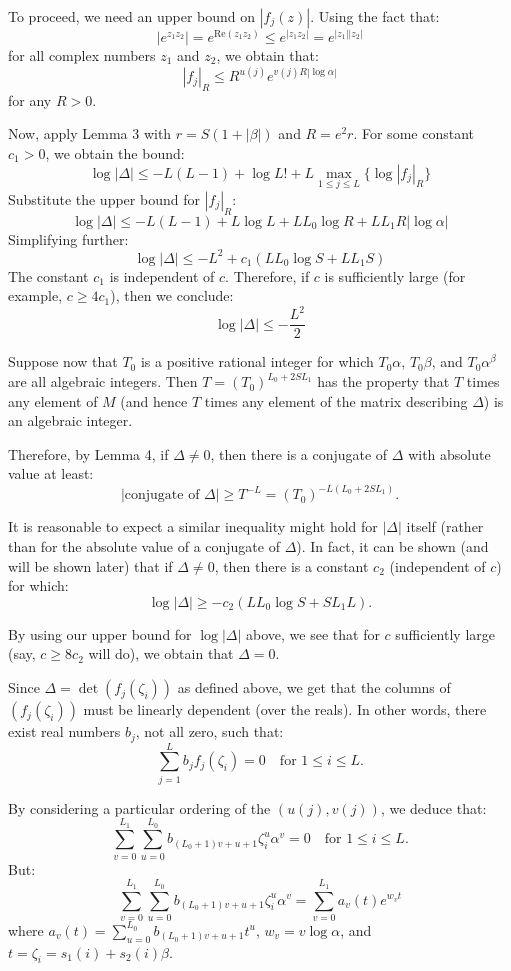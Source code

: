 \documentclass{article}
\newenvironment{proofbox}
  {\begin{mdframed}[linewidth=1pt,linecolor=black,backgroundcolor=white]\noindent\ignorespaces}
  {\end{mdframed}}
\begin{document}
\begin{proofbox}
To proceed, we need an upper bound on $|f_j(z)|$. Using the fact that:
\[
|e^{z_1 z_2}| = e^{\text{Re}(z_1 z_2)} \leq e^{|z_1 z_2|} = e^{|z_1||z_2|}
\]
for all complex numbers $z_1$ and $z_2$, we obtain that:
\[
|f_j|_R \leq R^{u(j)} e^{v(j) R |\log \alpha|}
\]
for any $R > 0$.

Now, apply Lemma 3 with $r = S(1 + |\beta|)$ and $R = e^2 r$. For some constant $c_1 > 0$, we obtain the bound:
\[
\log |\Delta| \leq -L(L - 1) + \log L! + L \max_{1 \leq j \leq L} \{ \log |f_j|_R \}
\]
Substitute the upper bound for $|f_j|_R$:
\[
\log |\Delta| \leq -L(L - 1) + L \log L + L L_0 \log R + L L_1 R |\log \alpha|
\]
Simplifying further:
\[
\log |\Delta| \leq -L^2 + c_1 (L L_0 \log S + L L_1 S)
\]
The constant $c_1$ is independent of $c$. Therefore, if $c$ is sufficiently large (for example, $c \geq 4c_1$), then we conclude:
\[
\log |\Delta| \leq -\frac{L^2}{2}
\]

Suppose now that $T_0$ is a positive rational integer for which $T_0\alpha$, $T_0\beta$, and $T_0\alpha^{\beta}$ are all algebraic integers. Then $T = (T_0)^{L_0 + 2S L_1}$ has the property that $T$ times any element of $M$ (and hence $T$ times any element of the matrix describing $\Delta$) is an algebraic integer.

Therefore, by Lemma 4, if $\Delta \neq 0$, then there is a conjugate of $\Delta$ with absolute value at least:
\[
|\text{conjugate of } \Delta| \geq T^{-L} = (T_0)^{-L(L_0 + 2S L_1)}.
\]

It is reasonable to expect a similar inequality might hold for $|\Delta|$ itself (rather than for the absolute value of a conjugate of $\Delta$). In fact, it can be shown (and will be shown later) that if $\Delta \neq 0$, then there is a constant $c_2$ (independent of $c$) for which:
\[
\log |\Delta| \geq -c_2(LL_0 \log S + SL_1L). \tag{10}
\]

By using our upper bound for $\log |\Delta|$ above, we see that for $c$ sufficiently large (say, $c \geq 8c_2$ will do), we obtain that $\Delta = 0$.

Since $\Delta = \det(f_j(\zeta_i))$ as defined above, we get that the columns of $(f_j(\zeta_i))$ must be linearly dependent (over the reals). In other words, there exist real numbers $b_j$, not all zero, such that:
\[
\sum_{j=1}^{L} b_j f_j(\zeta_i) = 0 \quad \text{for } 1 \leq i \leq L.
\]

By considering a particular ordering of the $(u(j), v(j))$, we deduce that:
\[
\sum_{v=0}^{L_1} \sum_{u=0}^{L_0} b_{(L_0 + 1)v + u + 1} \zeta_i^u \alpha^v = 0 \quad \text{for } 1 \leq i \leq L.
\]
But:
\[
\sum_{v=0}^{L_1} \sum_{u=0}^{L_0} b_{(L_0 + 1)v + u + 1} \zeta_i^u \alpha^v = \sum_{v=0}^{L_1} a_v(t) e^{w_v t}
\]
where $a_v(t) = \sum_{u=0}^{L_0} b_{(L_0 + 1)v + u + 1} t^u$, $w_v = v \log \alpha$, and $t = \zeta_i = s_1(i) + s_2(i)\beta$.


\end{proofbox}
\end{document}
